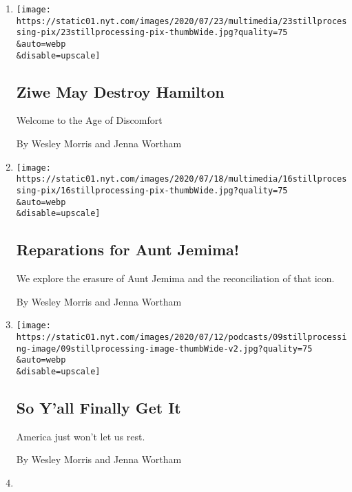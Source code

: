 \begin{enumerate}
\def\labelenumi{\arabic{enumi}.}
\item
  \href{/2020/07/23/podcasts/hamilton-ziwe-discomfort.html}{}

  \texttt{[image: https://static01.nyt.com/images/2020/07/23/multimedia/23stillprocessing-pix/23stillprocessing-pix-thumbWide.jpg?quality=75\\\&auto=webp\\\&disable=upscale]}

  \hypertarget{ziwe-may-destroy-hamilton}{%
  \subsection{Ziwe May Destroy
  Hamilton}\label{ziwe-may-destroy-hamilton}}

  Welcome to the Age of Discomfort

  By Wesley Morris and Jenna Wortham
\item
  \href{/2020/07/16/podcasts/reparations-for-aunt-jemima.html}{}

  \texttt{[image: https://static01.nyt.com/images/2020/07/18/multimedia/16stillprocessing-pix/16stillprocessing-pix-thumbWide.jpg?quality=75\\\&auto=webp\\\&disable=upscale]}

  \hypertarget{reparations-for-aunt-jemima}{%
  \subsection{Reparations for Aunt
  Jemima!}\label{reparations-for-aunt-jemima}}

  We explore the erasure of Aunt Jemima and the reconciliation of that
  icon.

  By Wesley Morris and Jenna Wortham
\item
  \href{/2020/07/09/podcasts/still-processing-black-lives-matter.html}{}

  \texttt{[image: https://static01.nyt.com/images/2020/07/12/podcasts/09stillprocessing-image/09stillprocessing-image-thumbWide-v2.jpg?quality=75\\\&auto=webp\\\&disable=upscale]}

  \hypertarget{so-yall-finally-get-it}{%
  \subsection{So Y'all Finally Get It}\label{so-yall-finally-get-it}}

  America just won't let us rest.

  By Wesley Morris and Jenna Wortham
\item
  \href{/2020/05/14/podcasts/still-processing-westworld-hollywood-utopia-dystopia.html}{}


\end{enumerate}
